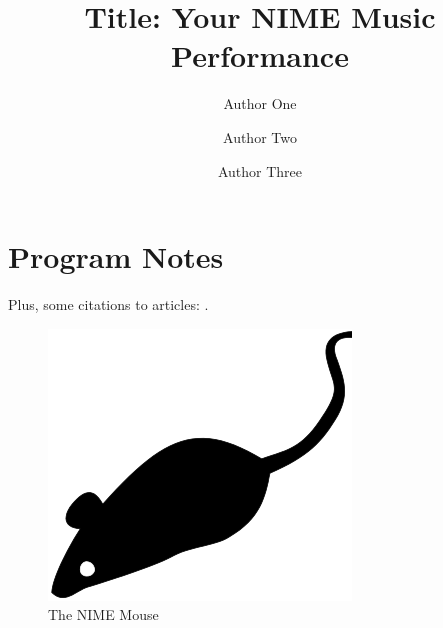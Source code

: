 \documentclass{nimemusic}
\begin{document}
\title{Title: Your NIME Music Performance}



\author{Author One}

\author{Author Two}

\author{Author Three}






\maketitle


\section{Program Notes}

\lipsum[1] 

Plus, some citations to articles: \cite{doe2023,
wizard2022, alien2024}.

\begin{figure}[hbt]
  \includegraphics{NIME_Mouse}
  \caption{The NIME Mouse}
\end{figure}
\end{document}
